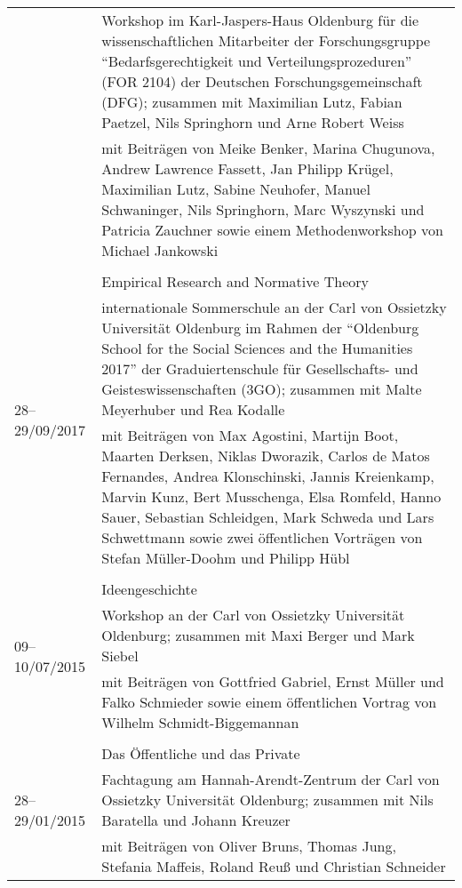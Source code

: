 \documentclass[a4paper,10pt]{article}
\begin{document}
\begin{longtable}{p{}p{}}
& \footnotesize{Workshop im Karl-Jaspers-Haus Oldenburg für die wissenschaftlichen Mitarbeiter der Forschungsgruppe \enquote{Bedarfsgerechtigkeit und Verteilungsprozeduren} (FOR 2104) der Deutschen Forschungsgemeinschaft (DFG); zusammen mit Maximilian Lutz, Fabian Paetzel, Nils Springhorn und Arne Robert Weiss}\\
& \footnotesize{mit Beiträgen von Meike Benker, Marina Chugunova, Andrew Lawrence Fassett, Jan Philipp Krügel, Maximilian Lutz, Sabine Neuhofer, Manuel Schwaninger, Nils Springhorn, Marc Wyszynski und Patricia Zauchner sowie einem Methodenworkshop von Michael Jankowski}\\
\\
\multirow{3}{1,75cm}{\footnotesize{28--29/09/2017}} & Empirical Research and Normative Theory\\
& \footnotesize{internationale Sommerschule an der Carl von Ossietzky Universität Oldenburg im Rahmen der \enquote{Oldenburg School for the Social Sciences and the Humanities 2017} der Graduiertenschule für Gesellschafts- und Geisteswissenschaften (3GO); zusammen mit Malte Meyerhuber und Rea Kodalle}\\
& \footnotesize{mit Beiträgen von Max Agostini, Martijn Boot, Maarten Derksen, Niklas Dworazik, Carlos de Matos Fernandes, Andrea Klonschinski, Jannis Kreienkamp, Marvin Kunz, Bert Musschenga, Elsa Romfeld, Hanno Sauer, Sebastian Schleidgen, Mark Schweda und Lars Schwettmann sowie zwei öffentlichen Vorträgen von Stefan Müller-Doohm und Philipp Hübl}\\
\\
\multirow{3}{1,75cm}{\footnotesize{09--10/07/2015}} & Ideengeschichte\\
& \footnotesize{Workshop an der Carl von Ossietzky Universität Oldenburg; zusammen mit Maxi Berger und Mark Siebel}\\
& \footnotesize{mit Beiträgen von Gottfried Gabriel, Ernst Müller und Falko Schmieder sowie einem öffentlichen Vortrag von Wilhelm Schmidt-Biggemannan}\\
\\
\multirow{3}{1,75cm}{\footnotesize{28--29/01/2015}} & Das Öffentliche und das Private\\
& \footnotesize{Fachtagung am Hannah-Arendt-Zentrum der Carl von Ossietzky Universität Oldenburg; zusammen mit Nils Baratella und Johann Kreuzer}\\
& \footnotesize{mit Beiträgen von Oliver Bruns, Thomas Jung, Stefania Maffeis, Roland Reuß und Christian Schneider}\\
\end{longtable}
\end{document}
